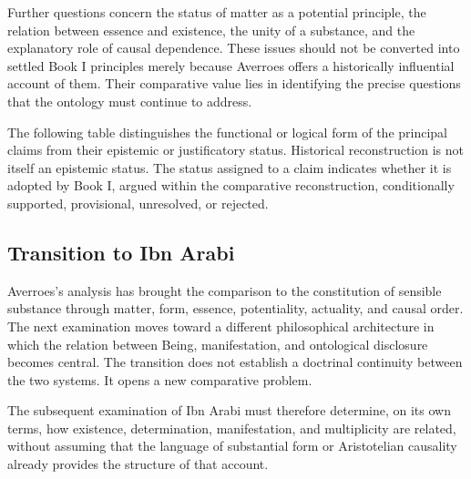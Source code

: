 \label{para:VS.B01.P01.C08.S15.SS18.P002}

Further questions concern the status
of matter as a potential principle,
the relation between essence and
existence, the unity of a substance,
and the explanatory role of causal
dependence. These issues should not
be converted into settled Book I
principles merely because Averroes
offers a historically influential
account of them. Their comparative
value lies in identifying the precise
questions that the ontology must
continue to address.

\label{para:VS.B01.P01.C08.S15.SS18.P003}

The following table distinguishes
the functional or logical form of
the principal claims from their
epistemic or justificatory status.
Historical reconstruction is not
itself an epistemic status. The
status assigned to a claim indicates
whether it is adopted by Book I,
argued within the comparative
reconstruction, conditionally supported,
provisional, unresolved, or rejected.

\label{para:VS.B01.P01.C08.S15.SS18.P004}





\subsection{Transition to Ibn Arabi}
\label{subsec:ch08_s15_ss19}

\label{para:VS.B01.P01.C08.S15.SS19.P001}

Averroes's analysis has brought the
comparison to the constitution of
sensible substance through matter,
form, essence, potentiality, actuality,
and causal order. The next examination
moves toward a different philosophical
architecture in which the relation
between Being, manifestation, and
ontological disclosure becomes central.
The transition does not establish a
doctrinal continuity between the two
systems. It opens a new comparative
problem.

\label{para:VS.B01.P01.C08.S15.SS19.P002}

The subsequent examination of Ibn Arabi
must therefore determine, on its own
terms, how existence, determination,
manifestation, and multiplicity are
related, without assuming that the
language of substantial form or
Aristotelian causality already provides
the structure of that account.


